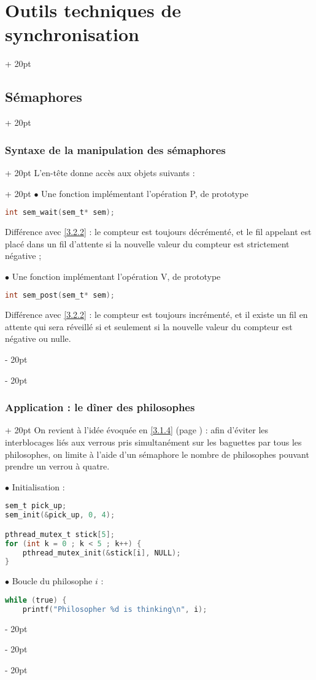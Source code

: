\documentclass[a4paper, 12pt, twoside]{article}
\newcommand{\ind}[1][20pt]{\advance\leftskip + #1}
\newcommand{\deind}[1][20pt]{\advance\leftskip - #1}
\newenvironment{indt}[2][20pt]{#2 \par \ind[#1]}{\par \deind} %
\begin{document}
\begin{indt}{\section{Outils techniques de synchronisation}}
\begin{indt}{\subsection{Sémaphores}}
\begin{indt}{\subsubsection{Syntaxe de la manipulation  des sémaphores}}
\begin{indt}{L'en-tête donne accès aux objets suivants :}
                    $\bullet$ Une fonction implémentant l'opération P, de prototype
                    \begin{lstlisting}[language=C, xleftmargin=100pt]
int sem_wait(sem_t* sem);\end{lstlisting}
                    Différence avec \ref{3.2.2} : le compteur est toujours décrémenté, et le fil appelant est placé dans un fil d'attente si la nouvelle valeur du compteur est strictement négative ;

                    $\bullet$ Une fonction implémentant l'opération V, de prototype
                    \begin{lstlisting}[language=C, xleftmargin=100pt]
int sem_post(sem_t* sem);\end{lstlisting}
                    Différence avec \ref{3.2.2} : le compteur est toujours incrémenté, et il existe un fil en attente qui sera réveillé si et seulement si la nouvelle valeur du compteur est négative ou nulle.
                \end{indt}
            \end{indt}

            \vspace{12pt}
            
            \begin{indt}{\subsubsection{Application : le dîner des philosophes}}
                On revient à l'idée évoquée en \ref{3.1.4} (page \pageref{3.1.4}) : afin d'éviter les interblocages liés aux verrous pris simultanément sur les baguettes par tous les philosophes, on limite à l'aide d'un sémaphore le nombre de philosophes pouvant prendre un verrou à quatre.

                \vspace{12pt}
                
                $\bullet$ Initialisation :

                \begin{lstlisting}[language=C, xleftmargin=80pt]
sem_t pick_up;
sem_init(&pick_up, 0, 4);

pthread_mutex_t stick[5];
for (int k = 0 ; k < 5 ; k++) {
    pthread_mutex_init(&stick[i], NULL);
}\end{lstlisting}

                $\bullet$ Boucle du philosophe $i$ :

                \begin{lstlisting}[language=C, xleftmargin=80pt]
while (true) {
    printf("Philosopher %d is thinking\n", i);


\end{lstlisting}
\end{indt}
\end{indt}
\end{indt}
\end{document}
